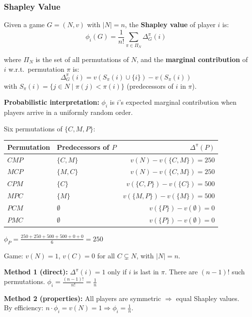 \bigseparator

\subsubsection{Shapley Value}

\begin{defbox}
Given a game $G = (N, v)$ with $|N| = n$, the \textbf{Shapley value} of player $i$ is:
\[
\phi_i(G) = \frac{1}{n!} \sum_{\pi \in \Pi_N} \Delta^\pi_G(i)
\]

where $\Pi_N$ is the set of all permutations of $N$, and the \textbf{marginal contribution} of $i$ w.r.t.\ permutation $\pi$ is:
\[
\Delta^\pi_G(i) = v(S_\pi(i) \cup \{i\}) - v(S_\pi(i))
\]
with $S_\pi(i) = \{j \in N \mid \pi(j) < \pi(i)\}$ (predecessors of $i$ in $\pi$).

\textbf{Probabilistic interpretation:} $\phi_i$ is $i$'s expected marginal contribution when players arrive in a uniformly random order.
\end{defbox}

\begin{exbox}
Six permutations of $\{C, M, P\}$:

\begin{center}
\renewcommand{\arraystretch}{1.2}
\begin{tabular}{@{} l l r @{}}
\toprule
\textbf{Permutation} & \textbf{Predecessors of $P$} & $\Delta^\pi(P)$ \\
\midrule
$CMP$ & $\{C, M\}$ & $v(N) - v(\{C,M\}) = 250$ \\
$MCP$ & $\{M, C\}$ & $v(N) - v(\{C,M\}) = 250$ \\
$CPM$ & $\{C\}$ & $v(\{C,P\}) - v(\{C\}) = 500$ \\
$MPC$ & $\{M\}$ & $v(\{M,P\}) - v(\{M\}) = 500$ \\
$PCM$ & $\emptyset$ & $v(\{P\}) - v(\emptyset) = 0$ \\
$PMC$ & $\emptyset$ & $v(\{P\}) - v(\emptyset) = 0$ \\
\bottomrule
\end{tabular}
\end{center}

$\phi_P = \frac{250 + 250 + 500 + 500 + 0 + 0}{6} = 250$
\end{exbox}

\begin{exbox}
Game: $v(N) = 1$, $v(C) = 0$ for all $C \subsetneq N$, with $|N| = n$.

\textbf{Method 1 (direct):} $\Delta^\pi(i) = 1$ only if $i$ is last in $\pi$. There are $(n-1)!$ such permutations.
$\phi_i = \frac{(n-1)!}{n!} = \frac{1}{n}$

\textbf{Method 2 (properties):} All players are symmetric $\Rightarrow$ equal Shapley values. By efficiency: $n \cdot \phi_i = v(N) = 1 \Rightarrow \phi_i = \frac{1}{n}$.
\end{exbox}

